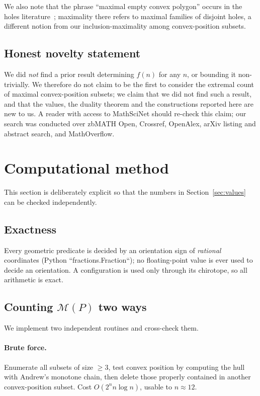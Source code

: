 \documentclass[11pt,a4paper]{article}
\theoremstyle{definition}
\newcommand{\M}{\mathcal{M}}
\begin{document}
We also note that the phrase ``maximal empty convex polygon'' occurs in the holes
literature~\cite{baranyvaltr04,pinchasi2006}; maximality there refers to maximal
families of disjoint holes, a different notion from our inclusion-maximality among
convex-position subsets.

\subsection{Honest novelty statement}

We did \emph{not} find a prior result determining $f(n)$ for any $n$, or bounding
it non-trivially.  We therefore do not claim to be the first to consider the
extremal count of maximal convex-position subsets; we claim that we did not find
such a result, and that the values, the duality theorem and the constructions
reported here are new to us.  A reader with access to MathSciNet should re-check
this claim; our search was conducted over zbMATH Open, Crossref, OpenAlex, arXiv
listing and abstract search, and MathOverflow.

\section{Computational method}
\label{sec:comp}

This section is deliberately explicit so that the numbers in
Section~\ref{sec:values} can be checked independently.

\subsection{Exactness}

Every geometric predicate is decided by an orientation sign of \emph{rational}
coordinates (Python ``fractions.Fraction``); no floating-point value is ever used
to decide an orientation.  A configuration is used only through its chirotope, so
all arithmetic is exact.

\subsection{Counting $\M(P)$ two ways}

We implement two independent routines and cross-check them.

\paragraph{Brute force.} Enumerate all subsets of size $\ge 3$, test convex
position by computing the hull with Andrew's monotone chain, then delete those
properly contained in another convex-position subset.  Cost $O(2^n n\log n)$,
usable to $n\approx 12$.
\end{document}
